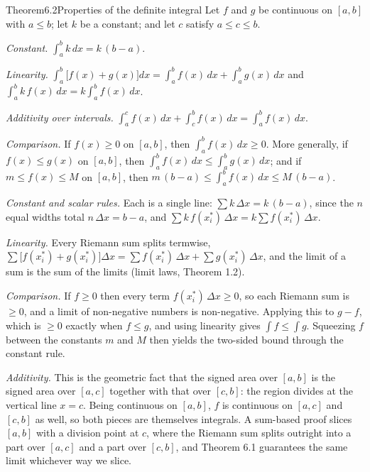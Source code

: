 \documentclass[a4paper,12pt,oneside]{memoir}
\begin{document}
\begin{envtheorem}{Theorem}{6.2}{Properties of the definite integral}
Let \(f\) and \(g\) be continuous on \([a, b]\) with \(a \le b\); let \(k\) be a constant; and let \(c\) satisfy \(a \le c \le b\).

\begin{steps}
  \item \emph{Constant.} \(\displaystyle\int_{a}^{b} k\,dx = k\,(b - a)\).
  \item \emph{Linearity.} \(\displaystyle\int_{a}^{b}\bigl[f(x) + g(x)\bigr]dx = \int_{a}^{b} f(x)\,dx + \int_{a}^{b} g(x)\,dx\) and \(\displaystyle\int_{a}^{b} k\,f(x)\,dx = k\int_{a}^{b} f(x)\,dx\).
  \item \emph{Additivity over intervals.} \(\displaystyle\int_{a}^{c} f(x)\,dx + \int_{c}^{b} f(x)\,dx = \int_{a}^{b} f(x)\,dx\).
  \item \emph{Comparison.} If \(f(x) \ge 0\) on \([a, b]\), then \(\displaystyle\int_{a}^{b} f(x)\,dx \ge 0\). More generally, if \(f(x) \le g(x)\) on \([a, b]\), then \(\displaystyle\int_{a}^{b} f(x)\,dx \le \int_{a}^{b} g(x)\,dx\); and if \(m \le f(x) \le M\) on \([a, b]\), then \(\displaystyle m\,(b - a) \le \int_{a}^{b} f(x)\,dx \le M\,(b - a)\).
\end{steps}
\end{envtheorem}
\emph{Constant and scalar rules.} Each is a single line: \(\sum k\,\Delta x = k\,(b - a)\), since the \(n\) equal widths total \(n\,\Delta x = b - a\), and \(\sum k\,f(x_{i}^{*})\,\Delta x = k \sum f(x_{i}^{*})\,\Delta x\).

\emph{Linearity.} Every Riemann sum splits termwise, \(\sum \bigl[f(x_{i}^{*}) + g(x_{i}^{*})\bigr]\Delta x = \sum f(x_{i}^{*})\,\Delta x + \sum g(x_{i}^{*})\,\Delta x\), and the limit of a sum is the sum of the limits (limit laws, Theorem 1.2).

\emph{Comparison.} If \(f \ge 0\) then every term \(f(x_{i}^{*})\,\Delta x \ge 0\), so each Riemann sum is \(\ge 0\), and a limit of non-negative numbers is non-negative. Applying this to \(g - f\), which is \(\ge 0\) exactly when \(f \le g\), and using linearity gives \(\int f \le \int g\). Squeezing \(f\) between the constants \(m\) and \(M\) then yields the two-sided bound through the constant rule.

\emph{Additivity.} This is the geometric fact that the signed area over \([a, b]\) is the signed area over \([a, c]\) together with that over \([c, b]\): the region divides at the vertical line \(x = c\). Being continuous on \([a, b]\), \(f\) is continuous on \([a, c]\) and \([c, b]\) as well, so both pieces are themselves integrals. A sum-based proof slices \([a, b]\) with a division point at \(c\), where the Riemann sum splits outright into a part over \([a, c]\) and a part over \([c, b]\), and Theorem 6.1 guarantees the same limit whichever way we slice.
\end{document}
